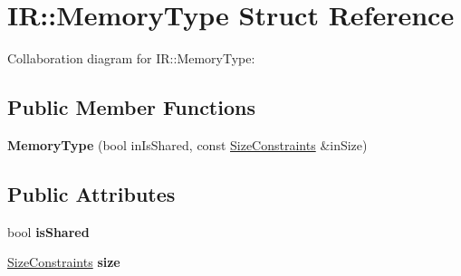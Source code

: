 \hypertarget{struct_i_r_1_1_memory_type}{}\section{IR\+:\+:Memory\+Type Struct Reference}
\label{struct_i_r_1_1_memory_type}


Collaboration diagram for IR\+:\+:Memory\+Type\+:
\subsection*{Public Member Functions}
\begin{DoxyCompactItemize}
\item 
\mbox{\label{struct_i_r_1_1_memory_type_a2e887ab42c62923f644577c4d51004e3}} 
{\bfseries Memory\+Type} (bool in\+Is\+Shared, const \mbox{\hyperlink{struct_i_r_1_1_size_constraints}{Size\+Constraints}} \&in\+Size)
\end{DoxyCompactItemize}
\subsection*{Public Attributes}
\begin{DoxyCompactItemize}
\item 
\mbox{\label{struct_i_r_1_1_memory_type_ae245ae2dbb9720d60091a741279559a0}} 
bool {\bfseries is\+Shared}
\item 
\mbox{\label{struct_i_r_1_1_memory_type_a64d44c1808398bd0152bc18934ca9f4f}} 
\mbox{\hyperlink{struct_i_r_1_1_size_constraints}{Size\+Constraints}} {\bfseries size}
\end{DoxyCompactItemize}

